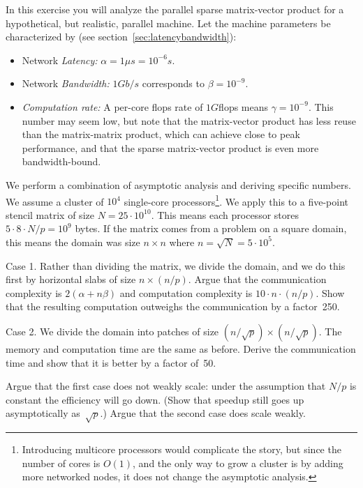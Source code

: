 \begin{exercise}
  \label{ex:scale-2d-domain}
  In this exercise you will analyze the parallel sparse matrix-vector
  product for a hypothetical, but realistic, parallel machine.
  Let the machine parameters be characterized by (see
  section~\ref{sec:latencybandwidth}):
  \begin{itemize}
  \item Network {\it Latency:} $\alpha=1\mu s=10^{-6}s$.
  \item Network {\it Bandwidth:} $1Gb/s$ corresponds to $\beta=10^{-9}$.
  \item {\it Computation rate:} A per-core flops rate of $1G$flops
    means $\gamma=10^{-9}$. This number may seem low, but note that the
    matrix-vector product has less reuse than the matrix-matrix
    product, which can achieve close to peak performance,
    and that the sparse matrix-vector product is even more
    bandwidth-bound.
  \end{itemize}
  We perform a combination of asymptotic analysis and deriving specific numbers.
  We assume a cluster of 
  $10^4$ single-core processors\footnote
  {Introducing multicore processors would complicate the story, but
    since the number of cores is $O(1)$, and the only way to grow a
    cluster is by adding more networked nodes, it does not change the
    asymptotic analysis.}. We apply this to a five-point
  stencil matrix of size $N=25\cdot 10^{10}$. This means each
  processor stores $5\cdot 8\cdot N/p=10^9$ bytes. If the matrix comes
  from a problem on a square domain, this means the domain was size
  $n\times n$ where $n=\sqrt N=5\cdot 10^5$.

  Case 1. Rather than dividing the matrix, we divide the domain, and
  we do this first by horizontal slabs of size $n\times (n/p)$. Argue
  that the communication complexity is $2(\alpha+n\beta)$ and
  computation complexity is $10\cdot n\cdot (n/p)$. Show that the
  resulting computation outweighs the communication by a factor~250.

  Case 2. We divide the domain into patches of size
  $(n/\sqrt p)\times (n/\sqrt p)$.
  The memory and computation time are the same as
  before. Derive the communication time and show that it is better by
  a factor of~50. 

  Argue that the first case does not weakly scale: under the
  assumption that $N/p$ is constant the efficiency will go down. 
  (Show that speedup still goes up asymptotically as~$\sqrt p$.)
  Argue that the second case does scale weakly.
\end{exercise}

